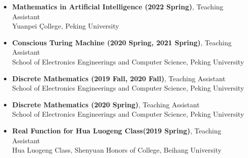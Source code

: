 \documentclass[9pt]{article}
\renewcommand{\section}[1]{\pagebreak[3]%
    \hyphenpenalty=10000%
    \vspace{1.3\baselineskip}%
    \phantomsection\addcontentsline{toc}{section}{#1}%
    \noindent\llap{\scshape\smash{\parbox[t]{\marginparwidth}{\raggedright #1}}}%
    \vspace{-\baselineskip}\par}
\newenvironment{outerlist}[1][\enskip\textbullet]%
        {\begin{itemize}[#1,leftmargin=*]}{\end{itemize}%
         \vspace{-.6\baselineskip}}
\newenvironment{innerlist}[1][\enskip\textbullet]%
        {\begin{itemize}[#1,leftmargin=*,parsep=0pt,itemsep=0pt,topsep=0pt,partopsep=0pt]}
        {\end{itemize}}
\begin{document}
\begin{innerlist}
	\item \textbf{Mathematics in Artificial Intelligence (2022 Spring)}, Teaching Assistant\\
	Yuanpei Çollege, Peking University
	\item \textbf{Conscious Turing Machine (2020 Spring, 2021 Spring)}, Teaching Assistant \\
	School of Electronics Engineerings and Computer Science, Peking University
	\item \textbf{Discrete Mathematics \uppercase\expandafter{} (2019 Fall, 2020 Fall)}, Teaching Assistant\\
	School of Electronics Engineerings and Computer Science, Peking University
	\item \textbf{Discrete Mathematics \uppercase\expandafter{} (2020 Spring)}, Teaching Assistant\\
	School of Electronics Engineerings and Computer Science, Peking University
	\item \textbf{Real Function for Hua Luogeng Class(2019 Spring)}, Teaching Assistant\\
	Hua Luogeng Class, Shenyuan Honors of College, Beihang University
\end{innerlist}


%
%
\end{document}
